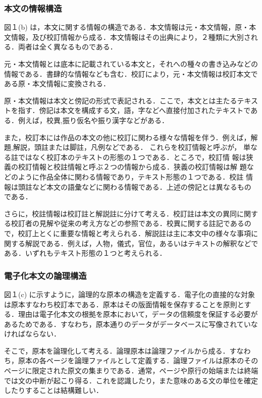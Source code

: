 \subsubsection{本文の情報構造}
\label{sec:2.2.3setu}

図１(b) は，本文に関する情報の構造である．本文情報は元・本文情報，原・本
文情報，及び校訂情報から成る．本文情報はその出典により，２種類に大別され
る．両者は全く異なるものである．

元・本文情報とは底本に記載されている本文と，それへの種々の書き込みなどの
情報である．書肆的な情報なども含む．校訂により，元・本文情報は校訂本文で
ある原・本文情報に変換される．

原・本文情報は本文と傍記の形式で表記される．ここで，本文とは主たるテキス
トを指す．傍記は本文を構成する文，語，字などへ直接付加されたテキストであ
る．例えば，校異\yougo ,振り仮名や振り漢字などがある．

また，校訂本には作品の本文の他に校訂に関わる様々な情報を伴う．例えば，解
題\yougo ,解説，頭註\yougo または脚註，凡例などである．
これらを校訂情報と呼ぶが，
単なる註ではなく校訂本のテキストの形態の１つである．ところで，校訂情
報は狭義の校訂情報と校註情報と呼ぶ２つの情報から成る．狭義の校訂情報は解
題などのように作品全体に関わる情報であり，テキスト形態の１つである．校註
情報は頭註など本文の語彙などに関わる情報である．上述の傍記とは異なるもの
である．

さらに，校註情報は校訂註と解説註に分けて考える．校訂註は本文の異同に関す
る校訂者の見解や従来の考え方などの参照である．校異に関する註記であるの
で，校訂上とくに重要な情報と考えられる．解説註は主に本文中の様々な事項に
関する解説である．例えば，人物，儀式，官位，あるいはテキストの解釈などで
ある．いずれもテキスト形態の１つと考えられる．


\subsubsection{電子化本文の論理構造}
\label{sec:2.2.4setu}

図１(c) に示すように，論理的な原本の構造を定義する．電子化の直接的な対象
は原本すなわち校訂本である．原本はその版面情報を保存することを原則とす
る．理由は電子化本文の根拠を原本において，データの信頼度を保証する必要が
あるためである．すなわち，原本通りのデータがデータベースに写像されていな
ければならない．

そこで，原本を論理化して考える．論理原本は論理ファイルから成る．すなわ
ち，原本の各ページを論理ファイルとして定義する．論理ファイルは原本のその
ページに限定された原文の集まりである．通常，ページや原行の始端または終端
では文の中断が起こり得る．これを認識したり，また意味のある文の単位を確定
したりすることは結構難しい．

